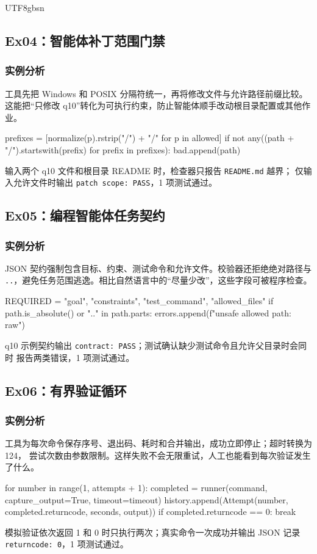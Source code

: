 \documentclass[11pt]{article}
\begin{document}
\begin{CJK*}{UTF8}{gbsn}
\subsection{Ex04：智能体补丁范围门禁}
\subsubsection{实例分析}
工具先把 Windows 和 POSIX 分隔符统一，再将修改文件与允许路径前缀比较。
这能把“只修改 q10”转化为可执行约束，防止智能体顺手改动根目录配置或其他作业。
\begin{CodeBlock}
prefixes = [normalize(p).rstrip("/") + "/" for p in allowed]
if not any((path + "/").startswith(prefix) for prefix in prefixes):
    bad.append(path)
\end{CodeBlock}
\begin{resultbox}
输入两个 q10 文件和根目录 README 时，检查器只报告 \texttt{README.md} 越界；
仅输入允许文件时输出 \texttt{patch scope: PASS}，1 项测试通过。
\end{resultbox}

\clearpage
\subsection{Ex05：编程智能体任务契约}
\subsubsection{实例分析}
JSON 契约强制包含目标、约束、测试命令和允许文件。校验器还拒绝绝对路径与
\texttt{..}，避免任务范围逃逸。相比自然语言中的“尽量少改”，这些字段可被程序检查。
\begin{CodeBlock}
REQUIRED = {"goal", "constraints", "test_command", "allowed_files"}
if path.is_absolute() or ".." in path.parts:
    errors.append(f"unsafe allowed path: {raw}")
\end{CodeBlock}
\begin{resultbox}
q10 示例契约输出 \texttt{contract: PASS}；测试确认缺少测试命令且允许父目录时会同时
报告两类错误，1 项测试通过。
\end{resultbox}

\subsection{Ex06：有界验证循环}
\subsubsection{实例分析}
工具为每次命令保存序号、退出码、耗时和合并输出，成功立即停止；超时转换为 124，
尝试次数由参数限制。这样失败不会无限重试，人工也能看到每次验证发生了什么。
\begin{CodeBlock}
for number in range(1, attempts + 1):
    completed = runner(command, capture_output=True, timeout=timeout)
    history.append(Attempt(number, completed.returncode, seconds, output))
    if completed.returncode == 0:
        break
\end{CodeBlock}
\begin{resultbox}
模拟验证依次返回 1 和 0 时只执行两次；真实命令一次成功并输出 JSON 记录
\texttt{returncode: 0}，1 项测试通过。
\end{resultbox}


\end{CJK*}
\end{document}
